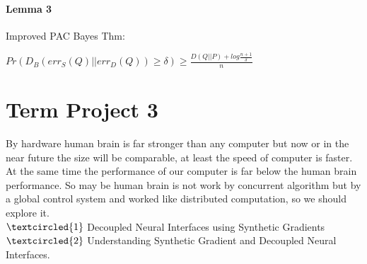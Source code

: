 \documentclass{article}
\begin{document}
\paragraph{Lemma 3}
Improved PAC Bayes Thm:
\begin{center}
$Pr(D_B(err_S(Q)||err_D(Q))\geq\delta)\geq\frac{D(Q||P)+log\frac{n+1}{\delta}}{n}$
\end{center}
\section{Term Project 3}
By hardware human brain is far stronger than any computer but now or in the near future the size will be comparable, at least the speed of computer is faster. At the same time the performance of our computer is far below the human brain performance. So may be human brain is not work by concurrent algorithm but by a global control system and worked like distributed computation, so we should explore it.
\\$\textcircled{1}$ Decoupled Neural Interfaces using Synthetic Gradients
\\$\textcircled{2}$ Understanding Synthetic Gradient and Decoupled Neural Interfaces.
\end{document}
